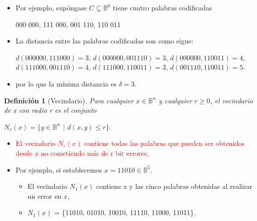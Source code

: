 \documentclass{beamer}
\theoremstyle{plain}
\newtheorem{definicion} [Definicion]{Definición}
\theoremstyle{example}
\theoremstyle{example}
\begin{document}
\begin{frame}  \small  


\begin{itemize} 

\item  Por ejemplo, supóngase $C \subseteq \mathbb{B}^6$ tiene cuatro palabras codificadas 
\begin{center}
 000 000, 111 000, 001 110, 110 011
\end{center}

\item La distancia entre las palabras codificadas son como sigue:

\begin{center}
$d(000 000, 111 000) = 3$,	$d(000 000, 001 110) = 3$,	$d(000 000, 110 011) = 4$,
$d(111 000, 001 110) = 4$,	$d(111 000, 110 011) = 3$,	$d(001 110, 110 011) = 5$.
\end{center}

\item  por lo que la mínima distancia es  $\delta = 3$.
\end{itemize} 

	


\end{frame} 

\begin{frame}  \small  

\begin{definicion} [Vecindario]
Para cualquier $x \in \mathbb{B}^n$ y cualquier $r \geq 0$, el vecindario de x con radio r es el conjunto 
\begin{center}
$N_r(x)=\{y \in \mathbb{B}^n$ $|$ $d(x,y)\leq r \}.$
\end{center}
\end{definicion}

\begin{itemize} 

\item  \textcolor{red}{El vecindario $N_r(x)$ contiene todas las palabras que pueden ser obtenidos desde $x$ no cometiendo más de r bit errores.} 

\item Por ejemplo, si establecemos $x=11010 \in \mathbb{B}^5$. 
\begin{itemize} 
\item El vecindario $N_1(x)$ contiene x y las cinco palabras obtenidas al realizar un error en $x$, 
\item $N_1(x)$ = \{11010, 01010, 10010, 11110, 11000, 11011\}.
\end{itemize} 

\end{itemize} 
\end{frame} 
\end{document}
